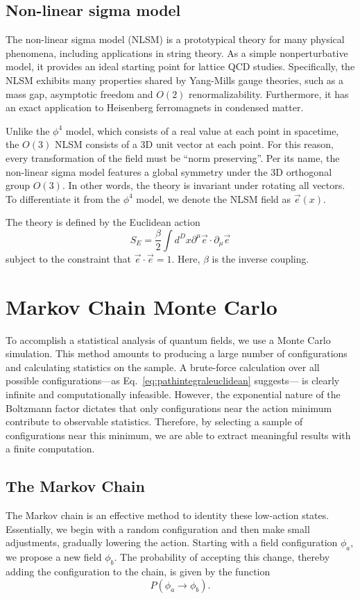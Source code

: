 \documentclass[12pt]{report}
\newcommand{\e}{\vec e}
\begin{document}
\subsection{Non-linear sigma model}

The non-linear sigma model (NLSM) is a prototypical theory for many physical phenomena, including applications in string theory. As a simple nonperturbative model, it provides an ideal starting point for lattice QCD studies. Specifically, the NLSM exhibits many properties shared by Yang-Mills gauge theories, such as a mass gap, asymptotic freedom and $O(2)$ renormalizability. Furthermore, it has an exact application to Heisenberg ferromagnets in condensed matter. 

Unlike the $\phi^4$ model, which consists of a real value at each point in spacetime, the $O(3)$ NLSM consists of a 3D unit vector at each point. For this reason, every transformation of the field must be ``norm preserving''. Per its name, the non-linear sigma model features a global symmetry under the 3D orthogonal group $O(3)$. In other words, the theory is invariant under rotating all vectors. To differentiate it from the $\phi^4$ model, we denote the NLSM field as $\e(x)$.

The theory is defined by the Euclidean action 
\begin{equation}
    \label{eq:nlsm euclidean action}
    S_E = \frac{\beta}{2} \int d^Dx \partial^\mu \e \cdot \partial_\mu \e
\end{equation}
subject to the constraint that $\e\cdot\e = 1$. Here, $\beta$ is the inverse coupling.


\section{Markov Chain Monte Carlo}

To accomplish a statistical analysis of quantum fields, we use a Monte Carlo simulation. This method amounts to producing a large number of configurations and calculating statistics on the sample. A brute-force calculation over all possible configurations---as Eq.~\ref{eq:pathintegraleuclidean} suggests--- is clearly infinite and computationally infeasible. However, the exponential nature of the Boltzmann factor dictates that only configurations near the action minimum contribute to observable statistics. Therefore, by selecting a sample of configurations near this minimum, we are able to extract meaningful results with a finite computation.

\subsection{The Markov Chain}
The Markov chain is an effective method to identity these low-action states. Essentially, we begin with a random configuration and then make small adjustments, gradually lowering the action. Starting with a field configuration $\phi_a$, we propose a new field $\phi_b$. The probability of accepting this change, thereby adding the configuration to the chain, is given by the function 
\[P(\phi_a \rightarrow \phi_b).\]
\end{document}
